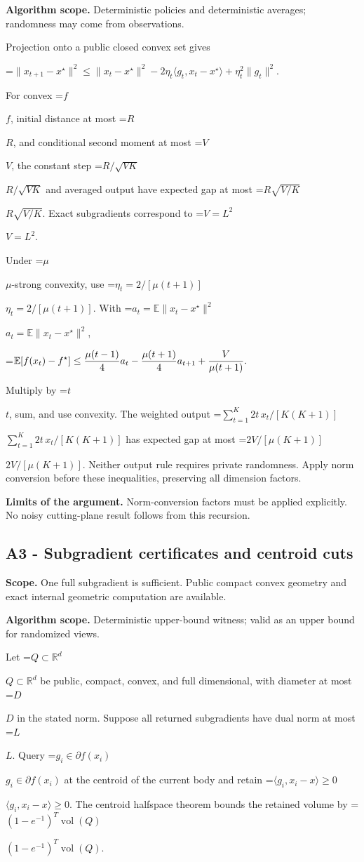 \documentclass[10pt,a4paper]{article}
\newcommand{\AtlasMath}[1]{\par\begingroup\centering\setbox0=\hbox{$\displaystyle #1$}\ifdim\wd0>1.4\linewidth\typeout{ATLAS WIDE FORMULA: \the\wd0}\fi\ifdim\wd0>\linewidth\resizebox{\linewidth}{!}{\box0}\else\box0\fi\par\endgroup}
\newcommand{\AtlasInlineMath}[1]{\begingroup\setbox0=\hbox{$#1$}\ifdim\wd0>.4\linewidth\endgroup\AtlasMath{#1}\else\endgroup$#1$\fi}
\begin{document}
\textbf{Algorithm scope.} Deterministic policies and deterministic averages; randomness may come from observations.

Projection onto a public closed convex set gives

\AtlasMath{\|x_{t+1}-x^\star\|^2\le\|x_t-x^\star\|^2
-2\eta_t\langle g_t,x_t-x^\star\rangle+\eta_t^2\|g_t\|^2.}

For convex \AtlasInlineMath{f}, initial distance at most \AtlasInlineMath{R}, and conditional second moment at most \AtlasInlineMath{V}, the constant step \AtlasInlineMath{R/\sqrt{VK}} and averaged output have expected gap at most \AtlasInlineMath{R\sqrt{V/K}}. Exact subgradients correspond to \AtlasInlineMath{V=L^2}.

Under \AtlasInlineMath{\mu}-strong convexity, use \AtlasInlineMath{\eta_t=2/[\mu(t+1)]}. With \AtlasInlineMath{a_t=\mathbb E\|x_t-x^\star\|^2},

\AtlasMath{\mathbb E[f(x_t)-f^\star]\le{\mu(t-1)\over4}a_t
-{\mu(t+1)\over4}a_{t+1}+{V\over\mu(t+1)}.}

Multiply by \AtlasInlineMath{t}, sum, and use convexity. The weighted output
\AtlasInlineMath{\sum_{t=1}^K2t\,x_t/[K(K+1)]} has expected gap at most \AtlasInlineMath{2V/[\mu(K+1)]}. Neither output rule requires private randomness. Apply norm conversion before these inequalities, preserving all dimension factors.

\textbf{Limits of the argument.} Norm-conversion factors must be applied explicitly. No noisy cutting-plane result follows from this recursion.

\subsection{A3 - Subgradient certificates and centroid cuts}
\textbf{Scope.} One full subgradient is sufficient. Public compact convex geometry and exact internal geometric computation are available.

\textbf{Algorithm scope.} Deterministic upper-bound witness; valid as an upper bound for randomized views.

Let \AtlasInlineMath{Q\subset\mathbb R^d} be public, compact, convex, and full dimensional, with diameter at most \AtlasInlineMath{D} in the stated norm. Suppose all returned subgradients have dual norm at most \AtlasInlineMath{L}. Query \AtlasInlineMath{g_i\in\partial f(x_i)} at the centroid of the current body and retain \AtlasInlineMath{\langle g_i,x_i-x\rangle\ge0}. The centroid halfspace theorem bounds the retained volume by \AtlasInlineMath{(1-e^{-1})^T\operatorname{vol}(Q)}.
\end{document}
